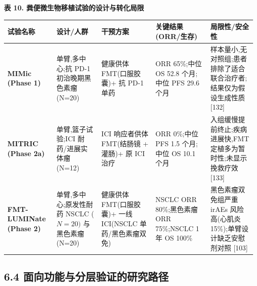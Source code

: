 \textbf{表 10. 粪便微生物移植试验的设计与转化局限}

{\def\LTcaptype{none} %
\begin{longtable}[]{@{}
  >{\raggedright\arraybackslash}p{}
  >{\raggedright\arraybackslash}p{}
  >{\raggedright\arraybackslash}p{}
  >{\raggedright\arraybackslash}p{}
  >{\raggedright\arraybackslash}p{}@{}}
\toprule\noalign{}
\begin{minipage}[b]{\linewidth}\raggedright
试验名称
\end{minipage} & \begin{minipage}[b]{\linewidth}\raggedright
设计/人群
\end{minipage} & \begin{minipage}[b]{\linewidth}\raggedright
干预方案
\end{minipage} & \begin{minipage}[b]{\linewidth}\raggedright
关键结果 (ORR/生存)
\end{minipage} & \begin{minipage}[b]{\linewidth}\raggedright
局限性/安全性
\end{minipage} \\
\midrule\noalign{}
\endhead
\bottomrule\noalign{}
\endlastfoot
\textbf{MIMic (Phase 1)} & 单臂,多中心;抗 PD-1 初治晚期黑色素瘤 (N=20) & 健康供体 FMT(口服胶囊)+ 抗 PD-1 单药 & ORR 65\%;中位 OS 52.8 个月;中位 PFS 29.6 个月 & 样本量小,无对照组;患者排除了适合联合治疗者;结果仅为假设生成性质 {[}132{]} \\
\textbf{MITRIC (Phase 2a)} & 单臂,篮子试验;ICI 耐药/进展实体瘤 (N=12) & ICI 响应者供体 FMT(结肠镜 + 灌肠)+ 原 ICI 治疗 & ORR 0\%;中位 PFS 1.5 个月;中位 OS 10.1 个月 & 入组缓慢提前终止;疾病进展快,FMT 定植多为暂时性;未显示挽救疗效 {[}133{]} \\
\textbf{FMT-LUMINate (Phase 2)} & 单臂,多中心;原发性耐药 NSCLC (\(N=20)\) 与黑色素瘤 (N=20) & 健康供体 FMT(口服胶囊)+ 一线 ICI(NSCLC 单药/黑色素瘤双免) & NSCLC ORR 80\%;黑色素瘤 ORR 75\%;NSCLC 1 年 OS 100\% & 黑色素瘤双免组严重 irAEs 风险高(心肌炎 15\%);单臂设计缺乏安慰剂对照 {[}103{]} \\
\end{longtable}
}

\subsection{6.4 面向功能与分层验证的研究路径}\label{ux9762ux5411ux529fux80fdux4e0eux5206ux5c42ux9a8cux8bc1ux7684ux7814ux7a76ux8defux5f84}

